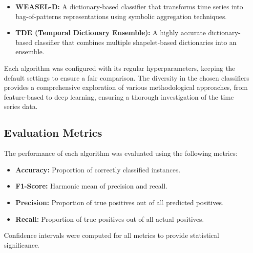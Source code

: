 \documentclass{ieeeaccess}
\begin{document}
\begin{itemize}
    \item \textbf{WEASEL-D:} A dictionary-based classifier that transforms time series into bag-of-patterns representations using symbolic aggregation techniques.
    \item \textbf{TDE (Temporal Dictionary Ensemble):} A highly accurate dictionary-based classifier that combines multiple shapelet-based dictionaries into an ensemble.
\end{itemize}

Each algorithm was configured with its regular hyperparameters, keeping the default settings to ensure a fair comparison. The diversity in the chosen classifiers provides a comprehensive exploration of various methodological approaches, from feature-based to deep learning, ensuring a thorough investigation of the time series data.

\subsection{Evaluation Metrics}
The performance of each algorithm was evaluated using the following metrics:
\begin{itemize}
    \item \textbf{Accuracy:} Proportion of correctly classified instances.
    \item \textbf{F1-Score:} Harmonic mean of precision and recall.
    \item \textbf{Precision:} Proportion of true positives out of all predicted positives.
    \item \textbf{Recall:} Proportion of true positives out of all actual positives.
\end{itemize}
Confidence intervals were computed for all metrics to provide statistical significance.

\end{document}

